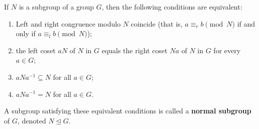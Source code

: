 If $N$ is a subgroup of a group $G$, then the following conditions are equivalent:
\begin{enumerate}
\item[(i)] Left and right congruence modulo $N$ coincide (that is, $a \equiv_r b \pmod{N}$ if and only if $a \equiv_l b \pmod{N}$);
\item[(ii)] the left coset $aN$ of $N$ in $G$ equals the right coset $Na$ of $N$ in $G$ for every $a \in G$;
\item[(iii)] $aNa^{-1} \subseteq N$ for all $a \in G$;
\item[(iv)] $aNa^{-1} = N$ for all $a \in G$.
\end{enumerate}
A subgroup satisfying these equivalent conditions is called a \textbf{normal subgroup} of $G$, denoted $N \trianglelefteq G$.
